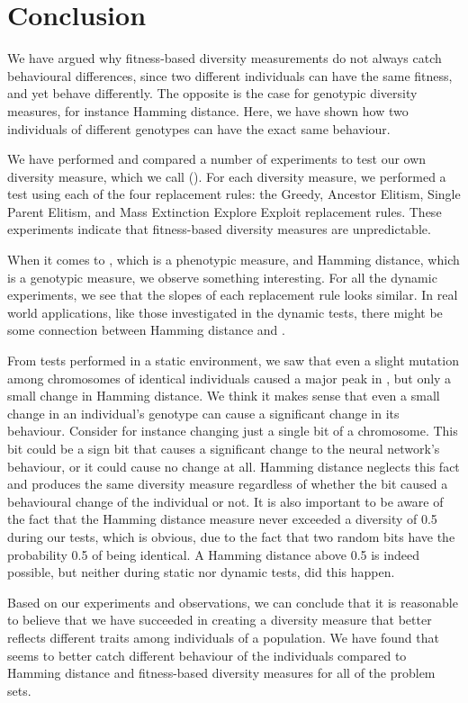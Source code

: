 \section{Conclusion}\label{sec:conclusion}
We have argued why fitness-based diversity measurements do not always catch behavioural differences, since two different individuals can have the same fitness, and yet behave differently.
The opposite is the case for genotypic diversity measures, for instance Hamming distance.
Here, we have shown how two individuals of different genotypes can have the exact same behaviour.

We have performed and compared a number of experiments to test our own diversity measure, which we call \di{} (\dia{}).
For each diversity measure, we performed a test using each of the four replacement rules: the Greedy, Ancestor Elitism, Single Parent Elitism, and Mass Extinction Explore Exploit replacement rules. These experiments indicate that fitness-based diversity measures are unpredictable.

When it comes to \dia{}, which is a phenotypic measure, and Hamming distance, which is a genotypic measure, we observe something interesting. For all the dynamic experiments, we see that the slopes of each replacement rule looks similar. In real world applications, like those investigated in the dynamic tests, there might be some connection between Hamming distance and \dia{}.

From tests performed in a static environment, we saw that even a slight mutation among chromosomes of identical individuals caused a major peak in \dia{}, but only a small change in Hamming distance.
We think it makes sense that even a small change in an individual's genotype can cause a significant change in its behaviour. Consider for instance changing just a single bit of a chromosome. This bit could be a sign bit that causes a significant change to the neural network's behaviour, or it could cause no change at all.
Hamming distance neglects this fact and produces the same diversity measure regardless of whether the bit caused a behavioural change of the individual or not.
It is also important to be aware of the fact that the Hamming distance measure never exceeded a diversity of \num{0.5} during our tests, which is obvious, due to the fact that two random bits have the probability \num{0.5} of being identical.
A Hamming distance above \num{0.5} is indeed possible, but neither during static nor dynamic tests, did this happen. 

Based on our experiments and observations, we can conclude that it is reasonable to believe that we have succeeded in creating a diversity measure that better reflects different traits among individuals of a population. We have found that \dia{} seems to better catch different behaviour of the individuals compared to Hamming distance and fitness-based diversity measures for all of the problem sets.

